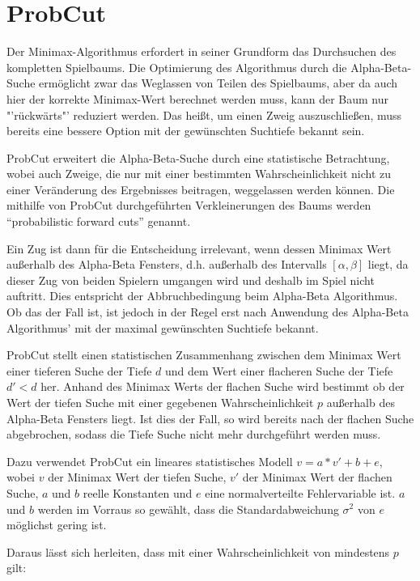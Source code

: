 \section{ProbCut}

Der Minimax-Algorithmus erfordert in seiner Grundform das Durchsuchen des kompletten Spielbaums.
Die Optimierung des Algorithmus durch die Alpha-Beta-Suche ermöglicht zwar das Weglassen von Teilen des Spielbaums, aber da auch hier der korrekte Minimax-Wert berechnet werden muss, kann der Baum nur "'rückwärts"' reduziert werden.
Das heißt, um einen Zweig auszuschließen, muss bereits eine bessere Option mit der gewünschten Suchtiefe bekannt sein.

ProbCut erweitert die Alpha-Beta-Suche durch eine statistische Betrachtung, wobei auch Zweige, die nur mit einer bestimmten Wahrscheinlichkeit nicht zu einer Veränderung des Ergebnisses beitragen, weggelassen werden können.
Die mithilfe von ProbCut durchgeführten Verkleinerungen des Baums werden "`probabilistic forward cuts"' genannt.

Ein Zug ist dann für die Entscheidung irrelevant, wenn dessen Minimax Wert außerhalb des Alpha-Beta Fensters, d.h. außerhalb des Intervalls \([\alpha,\beta]\) liegt, da dieser Zug von beiden Spielern umgangen wird und deshalb im Spiel nicht auftritt.
Dies entspricht der Abbruchbedingung beim Alpha-Beta Algorithmus.
Ob das der Fall ist, ist jedoch in der Regel erst nach Anwendung des Alpha-Beta Algorithmus' mit der maximal gewünschten Suchtiefe bekannt.

ProbCut stellt einen statistischen Zusammenhang zwischen dem Minimax Wert einer tieferen Suche der Tiefe \(d\) und dem Wert einer flacheren Suche der Tiefe \(d'<d\) her.
Anhand des Minimax Werts der flachen Suche wird bestimmt ob der Wert der tiefen Suche mit einer gegebenen Wahrscheinlichkeit \(p\) außerhalb des Alpha-Beta Fensters liegt.
Ist dies der Fall, so wird bereits nach der flachen Suche abgebrochen, sodass die Tiefe Suche nicht mehr durchgeführt werden muss.

Dazu verwendet ProbCut ein lineares statistisches Modell \(v=a*v'+b+e\), wobei \(v\) der Minimax Wert der tiefen Suche, \(v'\) der Minimax Wert der flachen Suche, \(a\) und \(b\) reelle Konstanten und \(e\) eine normalverteilte Fehlervariable ist.
\(a\) und \(b\) werden im Vorraus so gewählt, dass die Standardabweichung \(\sigma^{2}\) von \(e\) möglichst gering ist.

Daraus lässt sich herleiten, dass mit einer Wahrscheinlichkeit von mindestens \(p\) gilt:

